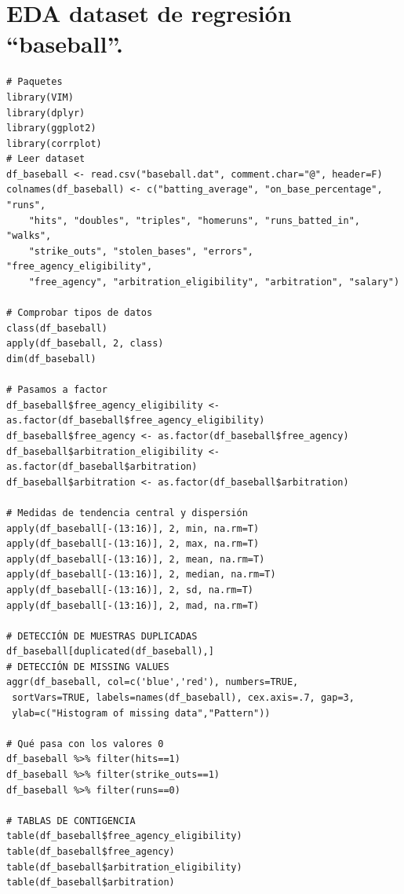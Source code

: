 \documentclass[a4paper,12pt, oneside]{book}
\begin{document}
\section{EDA dataset de regresión ``baseball''.}
\begin{verbatim}
# Paquetes
library(VIM)
library(dplyr)
library(ggplot2)
library(corrplot)
# Leer dataset
df_baseball <- read.csv("baseball.dat", comment.char="@", header=F)
colnames(df_baseball) <- c("batting_average", "on_base_percentage", "runs",
	"hits", "doubles", "triples", "homeruns", "runs_batted_in", "walks", 
	"strike_outs", "stolen_bases", "errors",  "free_agency_eligibility", 
	"free_agency", "arbitration_eligibility", "arbitration", "salary")

# Comprobar tipos de datos
class(df_baseball)
apply(df_baseball, 2, class)
dim(df_baseball)

# Pasamos a factor
df_baseball$free_agency_eligibility <- as.factor(df_baseball$free_agency_eligibility)
df_baseball$free_agency <- as.factor(df_baseball$free_agency)
df_baseball$arbitration_eligibility <- as.factor(df_baseball$arbitration)
df_baseball$arbitration <- as.factor(df_baseball$arbitration)

# Medidas de tendencia central y dispersión
apply(df_baseball[-(13:16)], 2, min, na.rm=T)
apply(df_baseball[-(13:16)], 2, max, na.rm=T)
apply(df_baseball[-(13:16)], 2, mean, na.rm=T)
apply(df_baseball[-(13:16)], 2, median, na.rm=T)
apply(df_baseball[-(13:16)], 2, sd, na.rm=T)
apply(df_baseball[-(13:16)], 2, mad, na.rm=T)

# DETECCIÓN DE MUESTRAS DUPLICADAS
df_baseball[duplicated(df_baseball),]
# DETECCIÓN DE MISSING VALUES
aggr(df_baseball, col=c('blue','red'), numbers=TRUE,
 sortVars=TRUE, labels=names(df_baseball), cex.axis=.7, gap=3,
 ylab=c("Histogram of missing data","Pattern"))

# Qué pasa con los valores 0
df_baseball %>% filter(hits==1)
df_baseball %>% filter(strike_outs==1)
df_baseball %>% filter(runs==0)

# TABLAS DE CONTIGENCIA
table(df_baseball$free_agency_eligibility)
table(df_baseball$free_agency)
table(df_baseball$arbitration_eligibility)
table(df_baseball$arbitration)



\end{verbatim}
\end{document}

